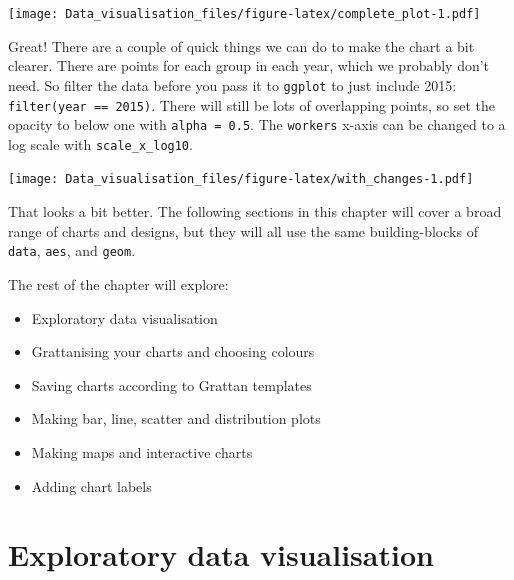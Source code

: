 \documentclass[]{book}
\newenvironment{Shaded}{\begin{snugshade}}{\end{snugshade}}
\newcommand{\DataTypeTok}[1]{\textcolor[rgb]{0.13,0.29,0.53}{#1}}
\newcommand{\FloatTok}[1]{\textcolor[rgb]{0.00,0.00,0.81}{#1}}
\newcommand{\KeywordTok}[1]{\textcolor[rgb]{0.13,0.29,0.53}{\textbf{#1}}}
\newcommand{\NormalTok}[1]{#1}
\newcommand{\OperatorTok}[1]{\textcolor[rgb]{0.81,0.36,0.00}{\textbf{#1}}}
\newcommand{\StringTok}[1]{\textcolor[rgb]{0.31,0.60,0.02}{#1}}
\providecommand{\tightlist}{%
  \setlength{\itemsep}{0pt}\setlength{\parskip}{0pt}}
\begin{document}
\texttt{[image: Data\_visualisation\_files/figure-latex/complete\_plot-1.pdf]}

Great! There are a couple of quick things we can do to make the chart a bit clearer. There are points for each group in each year, which we probably don't need. So filter the data before you pass it to \texttt{ggplot} to just include 2015: \texttt{filter(year\ ==\ 2015)}. There will still be lots of overlapping points, so set the opacity to below one with \texttt{alpha\ =\ 0.5}. The \texttt{workers} x-axis can be changed to a log scale with \texttt{scale\_x\_log10}.

\begin{Shaded}
\end{Shaded}

\texttt{[image: Data\_visualisation\_files/figure-latex/with\_changes-1.pdf]}

That looks a bit better. The following sections in this chapter will cover a broad range of charts and designs, but they will all use the same building-blocks of \texttt{data}, \texttt{aes}, and \texttt{geom}.

The rest of the chapter will explore:

\begin{itemize}
\tightlist
\item
  Exploratory data visualisation
\item
  Grattanising your charts and choosing colours
\item
  Saving charts according to Grattan templates
\item
  Making bar, line, scatter and distribution plots
\item
  Making maps and interactive charts
\item
  Adding chart labels
\end{itemize}

\hypertarget{exploratory-data-visualisation}{%
\section{Exploratory data visualisation}\label{exploratory-data-visualisation}}
\end{document}
